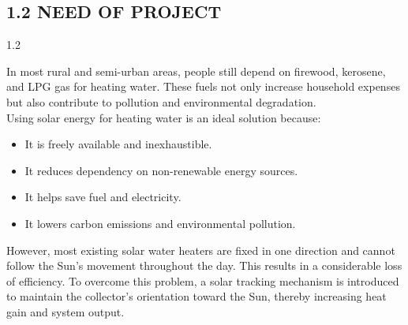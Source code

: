 \subsection*{1.2 NEED OF PROJECT}
\noindent
\begin{spacing}{1.2}
{\fontsize{10.5}{14.5}\selectfont
In most rural and semi-urban areas, people still depend on firewood, kerosene, and LPG gas for heating water. These fuels not only increase household expenses but also contribute to pollution and environmental degradation.\\[3mm]
Using solar energy for heating water is an ideal solution because:
\begin{itemize}[leftmargin=8mm, itemsep=1.5mm, label=\textbullet]
  \item It is freely available and inexhaustible.
  \item It reduces dependency on non-renewable energy sources.
  \item It helps save fuel and electricity.
  \item It lowers carbon emissions and environmental pollution.
\end{itemize}
However, most existing solar water heaters are fixed in one direction and cannot follow the Sun's movement throughout the day. This results in a considerable loss of efficiency. To overcome this problem, a solar tracking mechanism is introduced to maintain the collector's orientation toward the Sun, thereby increasing heat gain and system output.
}
\end{spacing}
\clearpage
